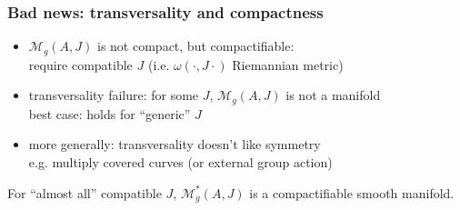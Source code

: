 \begin{frame} %
  \frametitle{Bad news: transversality and compactness}
  \begin{itemize}
    \item $\mathcal{M}_g(A,J)$ is not compact, but compactifiable:\\
    require compatible $J$ (i.e. $\omega(\cdot,J\cdot)$ Riemannian metric)
    \item transversality failure: for some $J$, $\mathcal{M}_g(A,J)$ is not a manifold\\
    best case: holds for ``generic'' $J$
    \item more generally: transversality doesn't like symmetry\\
    e.g. multiply covered curves (or external group action)
  \end{itemize}
\begin{theorem}
  For ``almost all'' compatible $J$, $\mathcal{M}^*_g(A,J)$ is a compactifiable smooth manifold.
\end{theorem}
\end{frame}
